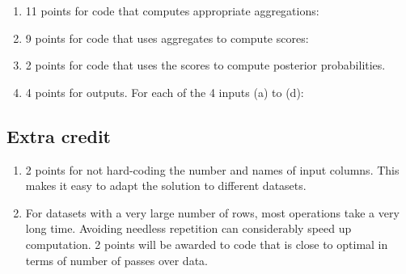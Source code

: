 \documentclass[11pt]{article}
\begin{document}
\begin{enumerate}
\item 11 points for code that computes appropriate aggregations:
\item 9 points for code that uses aggregates to compute scores:
\item 2 points for code that uses the scores to compute posterior probabilities.
\item 4 points for outputs. For each of the 4 inputs (a) to (d):
\end{enumerate}

\subsection{Extra credit}

\begin{enumerate}
\item 2 points for not hard-coding the number and names of input columns.
    This makes it easy to adapt the solution to different datasets.
\item For datasets with a very large number of rows, most operations take a very long time.
    Avoiding needless repetition can considerably speed up computation.
    2 points will be awarded to code that is close to optimal in terms of number of passes over data.
\end{enumerate}
\end{document}
